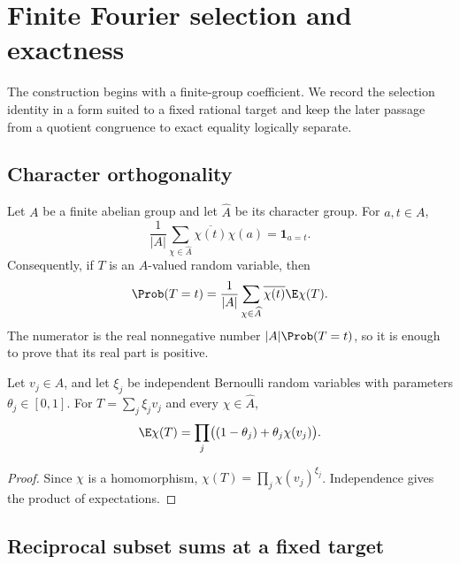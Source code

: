 \section{Finite Fourier selection and exactness}
\label{sec:fourier-selection}

The construction begins with a finite-group coefficient.  We record the selection identity in a form suited to a fixed rational target and keep the later passage from a quotient congruence to exact equality logically separate.

\subsection{Character orthogonality}

Let $A$ be a finite abelian group and let $\widehat A$ be its character group.  For $a,t\in A$,
\[
 \frac1{|A|}\sum_{\chi\in\widehat A}\overline{\chi(t)}\chi(a)
 =\mathbf 1_{a=t}.
\]
Consequently, if $T$ is an $A$-valued random variable, then
\begin{equation}
\label{eq:finite-fourier-coefficient}
 \Prob(T=t)
 =\frac1{|A|}\sum_{\chi\in\widehat A}
   \overline{\chi(t)}\E\chi(T).
\end{equation}
The numerator is the real nonnegative number $|A|\Prob(T=t)$, so it is enough to prove that its real part is positive.

\begin{lemma}
\label{lem:independent-product}
Let $v_j\in A$, and let $\xi_j$ be independent Bernoulli random variables with parameters $\theta_j\in[0,1]$.  For $T=\sum_j\xi_jv_j$ and every $\chi\in\widehat A$,
\[
 \E\chi(T)=\prod_j\bigl((1-\theta_j)+\theta_j\chi(v_j)\bigr).
\]
\end{lemma}

\begin{proof}
Since $\chi$ is a homomorphism, $\chi(T)=\prod_j\chi(v_j)^{\xi_j}$.  Independence gives the product of expectations.
\end{proof}

\subsection{Reciprocal subset sums at a fixed target}

